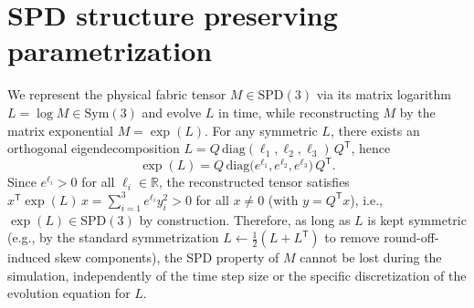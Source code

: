 \section{SPD structure preserving parametrization}
\label{sec:structure-preserving}
We represent the physical fabric tensor $M\in\mathrm{SPD}(3)$ via its matrix logarithm $L=\log M\in\mathrm{Sym}(3)$ and evolve $L$ in time, while reconstructing $M$ by the
matrix exponential $M=\exp(L)$. For any symmetric $L$, there exists an orthogonal eigendecomposition $L=Q\,\mathrm{diag}(\ell_1,\ell_2,\ell_3)\,Q^{\mathsf T}$, hence
\[
\exp(L)=Q\,\mathrm{diag}\!\big(e^{\ell_1},e^{\ell_2},e^{\ell_3}\big)\,Q^{\mathsf T}.
\]
Since $e^{\ell_i}>0$ for all $\ell_i\in\mathbb{R}$, the reconstructed tensor satisfies $x^{\mathsf T}\exp(L)\,x=\sum_{i=1}^3 e^{\ell_i} y_i^2>0$ for all $x\neq 0$ (with $y=Q^{\mathsf T}x$), i.e., $\exp(L)\in\mathrm{SPD}(3)$ by construction. Therefore, as long as $L$ is kept symmetric (e.g., by the standard symmetrization $L\leftarrow \tfrac12(L+L^{\mathsf T})$ to remove round-off-induced skew components), the SPD property of $M$ cannot be lost during the simulation, independently of the time step size or the specific discretization of the evolution equation for $L$.
